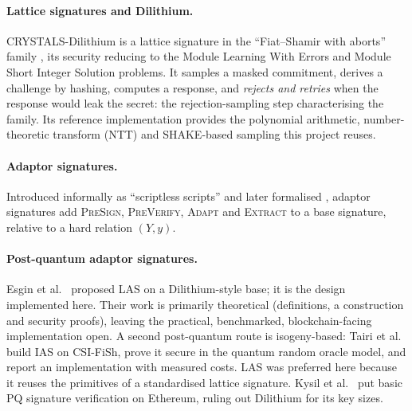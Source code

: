 \paragraph{Lattice signatures and Dilithium.}
CRYSTALS-Dilithium is a lattice signature in the ``Fiat--Shamir with aborts'' family
\cite{ducas2018crystals,lyubashevsky2012lattice}, its security reducing to the Module
Learning With Errors and Module Short Integer Solution problems. It samples a masked
commitment, derives a challenge by hashing, computes a response, and \emph{rejects and
retries} when the response would leak the secret: the rejection-sampling step
characterising the family. Its reference implementation provides the polynomial
arithmetic, number-theoretic transform (NTT) and SHAKE-based sampling this project
reuses.

\paragraph{Adaptor signatures.}
Introduced informally as ``scriptless scripts'' \cite{poelstra2017} and later formalised
\cite{aumayr2021generalized}, adaptor signatures add \textsc{PreSign}, \textsc{PreVerify},
\textsc{Adapt} and \textsc{Extract} to a base signature, relative to a hard relation
$(Y,y)$.

\paragraph{Post-quantum adaptor signatures.}
Esgin et al.\ \cite{esgin2020post} proposed LAS on a
Dilithium-style base; it is the design implemented here. Their work
is primarily theoretical (definitions, a construction and security proofs), leaving
the practical, benchmarked, blockchain-facing implementation open.
A second post-quantum route is isogeny-based: Tairi et al.\ \cite{tairi2021post} build IAS
on CSI-FiSh, prove it secure in the quantum random oracle model, and report an
implementation with measured costs. LAS was preferred here because it reuses the
primitives of a standardised lattice signature. Kysil et al.\ \cite{kysil2025poqeth} put basic PQ
signature verification on Ethereum, ruling out Dilithium for its key sizes.

